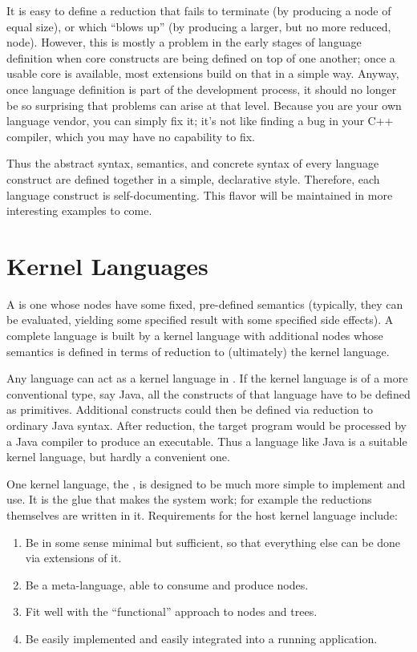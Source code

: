 It is easy to define a reduction that fails to terminate (by producing a node of equal size), or which ``blows up'' (by producing a larger, but no more reduced, node). However, this is mostly a problem in the early stages of language definition when core constructs are being defined on top of one another; once a usable core is available, most extensions build on that in a simple way. Anyway, once language definition is part of the development process, it should no longer be so surprising that problems can arise at that level. Because you are your own language vendor, you can simply fix it; it's not like finding a bug in your C++ compiler, which you may have no capability to fix.

Thus the abstract syntax, semantics, and concrete syntax of every language construct are defined together in a simple, declarative style. Therefore, each language construct is self-documenting. This flavor will be maintained in more interesting examples to come.

%
%

\section{Kernel Languages}
A  is one whose nodes have some fixed, pre-defined semantics (typically, they can be evaluated, yielding some specified result with some specified side effects). A complete language is built by  a kernel language with additional nodes whose semantics is defined in terms of reduction to (ultimately) the kernel language.

Any language can act as a kernel language in \Meta. If the kernel language is of a more conventional type, say Java, all the constructs of that language have to be defined as primitives. Additional constructs could then be defined via reduction to ordinary Java syntax. After reduction, the target program would be processed by a Java compiler to produce an executable. Thus a language like Java is a suitable kernel language, but hardly a convenient one.

One kernel language, the , is designed to be much more simple to implement and use. It is the glue that makes the system work; for example the reductions themselves are written in it. Requirements for the host kernel language include:
\begin{enumerate}
\item Be in some sense minimal but sufficient, so that everything else can be done via extensions of it.
\item Be a meta-language, able to consume and produce nodes.
\item Fit well with the ``functional'' approach to nodes and trees.
\item Be easily implemented and easily integrated into a running application.
\end{enumerate}

